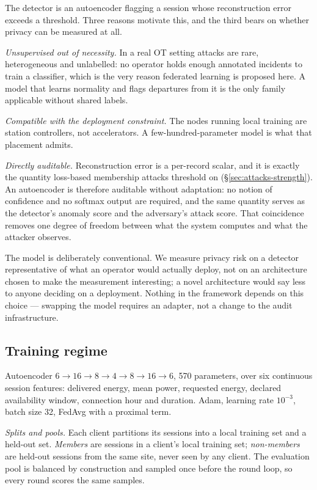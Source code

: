 The detector is an autoencoder flagging a session whose reconstruction error
exceeds a threshold. Three reasons motivate this, and the third bears on
whether privacy can be measured at all.

\emph{Unsupervised out of necessity.} In a real OT setting attacks are rare,
heterogeneous and unlabelled: no operator holds enough annotated incidents to
train a classifier, which is the very reason federated learning is proposed
here. A model that learns normality and flags departures from it is the only
family applicable without shared labels.

\emph{Compatible with the deployment constraint.} The nodes running local
training are station controllers, not accelerators. A few-hundred-parameter
model is what that placement admits.

\emph{Directly auditable.} Reconstruction error is a per-record scalar, and it
is exactly the quantity loss-based membership attacks threshold on
(\S\ref{sec:attacks-strength}). An autoencoder is therefore auditable without
adaptation: no notion of confidence and no softmax output are required, and the
same quantity serves as the detector's anomaly score and the adversary's attack
score. That coincidence removes one degree of freedom between what the system
computes and what the attacker observes.

The model is deliberately conventional. We measure privacy risk on a detector
representative of what an operator would actually deploy, not on an
architecture chosen to make the measurement interesting; a novel architecture
would say less to anyone deciding on a deployment. Nothing in the framework
depends on this choice --- swapping the model requires an adapter, not a change
to the audit infrastructure.

\subsection{Training regime}
\label{sec:setup-training}

Autoencoder $6 \rightarrow 16 \rightarrow 8 \rightarrow 4 \rightarrow 8
\rightarrow 16 \rightarrow 6$, 570 parameters, over six continuous session
features: delivered energy, mean power, requested energy, declared
availability window, connection hour and duration. Adam, learning rate
$10^{-3}$, batch size 32, FedAvg with a proximal term.

\emph{Splits and pools.} Each client partitions its sessions into a local
training set and a held-out set. \emph{Members} are sessions in a client's
local training set; \emph{non-members} are held-out sessions from the same
site, never seen by any client. The evaluation pool is balanced by construction
and sampled once before the round loop, so every round scores the same samples.

